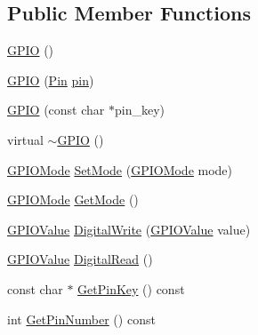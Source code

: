 \subsection*{Public Member Functions}
\begin{DoxyCompactItemize}
\item 
\hyperlink{classcubesat_1_1GPIO_ae37721459fb7d477c095f60daaf3cd58}{G\+P\+IO} ()
\item 
\hyperlink{classcubesat_1_1GPIO_aeacb853859e7ca4d8d72999bc0cffb0f}{G\+P\+IO} (\hyperlink{namespacecubesat_af928ed4b56ef60d75953a91225b37a00}{Pin} \hyperlink{classcubesat_1_1GPIO_af3e219ff169f027626becf1797a02c50}{pin})
\item 
\hyperlink{classcubesat_1_1GPIO_aab35cd38f7fb1cec4ee7c5b1ff4adc13}{G\+P\+IO} (const char $\ast$pin\+\_\+key)
\item 
virtual \hyperlink{classcubesat_1_1GPIO_ae8205f95f108a15a612485b6358031a1}{$\sim$\+G\+P\+IO} ()
\item 
\hyperlink{namespacecubesat_a0c9368193169b1a4ca3aa1ba47331abf}{G\+P\+I\+O\+Mode} \hyperlink{classcubesat_1_1GPIO_a1aacbbd48883285a4730ec7167b1487d}{Set\+Mode} (\hyperlink{namespacecubesat_a0c9368193169b1a4ca3aa1ba47331abf}{G\+P\+I\+O\+Mode} mode)
\item 
\hyperlink{namespacecubesat_a0c9368193169b1a4ca3aa1ba47331abf}{G\+P\+I\+O\+Mode} \hyperlink{classcubesat_1_1GPIO_a6c9fa56927c168d8db8b1dd62fbc4cde}{Get\+Mode} ()
\item 
\hyperlink{namespacecubesat_ac60a35ee01913deca5e771944eb902ed}{G\+P\+I\+O\+Value} \hyperlink{classcubesat_1_1GPIO_a27eaf22ac52502400ffeddf7c90506ed}{Digital\+Write} (\hyperlink{namespacecubesat_ac60a35ee01913deca5e771944eb902ed}{G\+P\+I\+O\+Value} value)
\item 
\hyperlink{namespacecubesat_ac60a35ee01913deca5e771944eb902ed}{G\+P\+I\+O\+Value} \hyperlink{classcubesat_1_1GPIO_a427ef463f54d768e8d9b6abc449c5d9f}{Digital\+Read} ()
\item 
const char $\ast$ \hyperlink{classcubesat_1_1GPIO_af6aca76f5db71a14b69157360f7c070d}{Get\+Pin\+Key} () const
\item 
int \hyperlink{classcubesat_1_1GPIO_a865c8e0987a8f728a42aa5e2d9dd2241}{Get\+Pin\+Number} () const
\end{DoxyCompactItemize}
